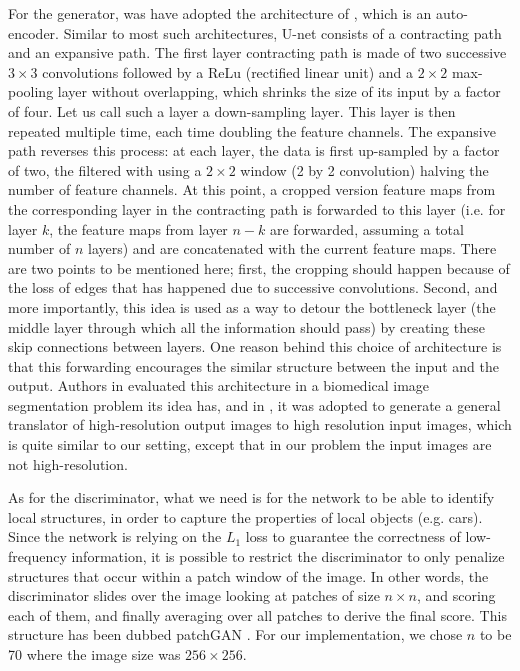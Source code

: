 For the generator, was have adopted the architecture of \cite{unet}, which is an auto-encoder. Similar to most such architectures, U-net consists of a contracting path and an expansive path. The first layer contracting path is made of two successive $3 \times 3$ convolutions followed by a ReLu (rectified linear unit) and a $2 \times 2$ max-pooling layer without overlapping, which shrinks the size of its input by a factor of four. Let us call such a layer a down-sampling layer. This layer is then repeated multiple time, each time doubling the feature channels. The expansive path reverses this process: at each layer, the data is first up-sampled by a factor of two, the filtered with using a $2 \times 2$ window (2 by 2 convolution) halving the number of feature channels. At this point, a cropped version feature maps from the corresponding layer in the contracting path is forwarded to this layer (i.e. for layer $k$, the feature maps from layer $n-k$ are forwarded, assuming a total number of $n$ layers) and are concatenated with the current feature maps. There are two points to be mentioned here; first, the cropping should happen because of the loss of edges that has happened due to successive convolutions. Second, and more importantly, this idea is used as a way to detour the bottleneck layer (the middle layer through which all the information should pass) by creating these skip connections between layers. One reason behind this choice of architecture is that this forwarding encourages the similar structure between the input and the output. Authors in \cite{unet} evaluated this architecture in a biomedical image segmentation problem its idea has, and in \cite{pix2pix}, it was adopted to generate a general translator of high-resolution output images to high resolution input images, which is quite similar to our setting, except that in our problem the input images are not high-resolution.

As for the discriminator, what we need is for the network to be able to identify local structures, in order to capture the properties of local objects (e.g. cars). Since the network is relying on the $L_1$ loss to guarantee the correctness of low-frequency information, it is possible to restrict the discriminator to only penalize structures that occur within a patch window of the image. In other words, the discriminator slides over the image looking at patches of size $n \times n$, and scoring each of them, and finally averaging over all patches to derive the final score. This structure has been dubbed patchGAN \cite{pix2pix}. For our implementation, we chose $n$ to be 70 where the image size was $256 \times 256$.
